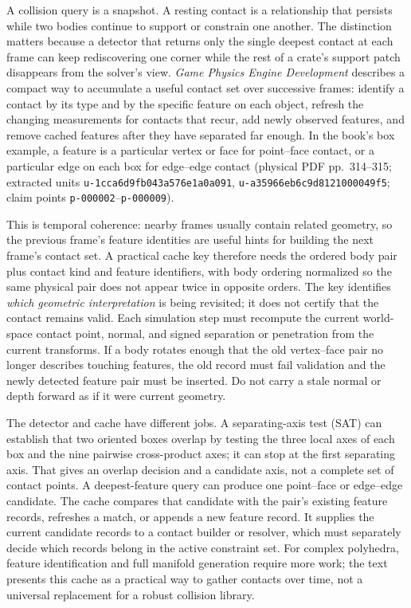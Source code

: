 A collision query is a snapshot. A resting contact is a relationship that persists while two bodies continue to support or constrain one another. The distinction matters because a detector that returns only the single deepest contact at each frame can keep rediscovering one corner while the rest of a crate's support patch disappears from the solver's view. \emph{Game Physics Engine Development} describes a compact way to accumulate a useful contact set over successive frames: identify a contact by its type and by the specific feature on each object, refresh the changing measurements for contacts that recur, add newly observed features, and remove cached features after they have separated far enough. In the book's box example, a feature is a particular vertex or face for point--face contact, or a particular edge on each box for edge--edge contact (physical PDF pp.~314--315; extracted units \texttt{u-1cca6d9fb043a576e1a0a091}, \texttt{u-a35966eb6c9d8121000049f5}; claim points \texttt{p-000002}--\texttt{p-000009}).

This is temporal coherence: nearby frames usually contain related geometry, so the previous frame's feature identities are useful hints for building the next frame's contact set. A practical cache key therefore needs the ordered body pair plus contact kind and feature identifiers, with body ordering normalized so the same physical pair does not appear twice in opposite orders. The key identifies \emph{which geometric interpretation} is being revisited; it does not certify that the contact remains valid. Each simulation step must recompute the current world-space contact point, normal, and signed separation or penetration from the current transforms. If a body rotates enough that the old vertex--face pair no longer describes touching features, the old record must fail validation and the newly detected feature pair must be inserted. Do not carry a stale normal or depth forward as if it were current geometry.

The detector and cache have different jobs. A separating-axis test (SAT) can establish that two oriented boxes overlap by testing the three local axes of each box and the nine pairwise cross-product axes; it can stop at the first separating axis. That gives an overlap decision and a candidate axis, not a complete set of contact points. A deepest-feature query can produce one point--face or edge--edge candidate. The cache compares that candidate with the pair's existing feature records, refreshes a match, or appends a new feature record. It supplies the current candidate records to a contact builder or resolver, which must separately decide which records belong in the active constraint set. For complex polyhedra, feature identification and full manifold generation require more work; the text presents this cache as a practical way to gather contacts over time, not a universal replacement for a robust collision library.

